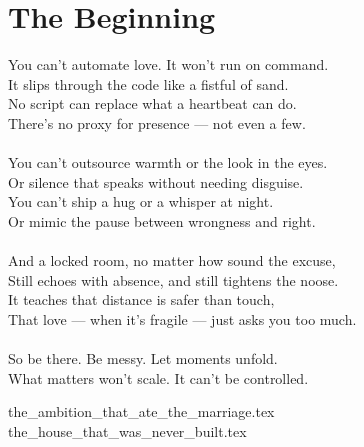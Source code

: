 \part{The Beginning}

\vfill

\begin{flushright}
\Large
You can’t automate love. It won’t run on command. \\ 
It slips through the code like a fistful of sand. \\
No script can replace what a heartbeat can do. \\
There's no proxy for presence --- not even a few. \\
\ \\
You can’t outsource warmth or the look in the eyes. \\
Or silence that speaks without needing disguise. \\
You can’t ship a hug or a whisper at night.\\
Or mimic the pause between wrongness and right. \\
\ \\
And a locked room, no matter how sound the excuse, \\
Still echoes with absence, and still tightens the noose. \\
It teaches that distance is safer than touch, \\
That love --- when it's fragile --- just asks you too much. \\
\ \\
So be there. Be messy. Let moments unfold.\\
What matters won't scale. It can’t be controlled.
\end{flushright}

{the_ambition_that_ate_the_marriage.tex}
{the_house_that_was_never_built.tex}


